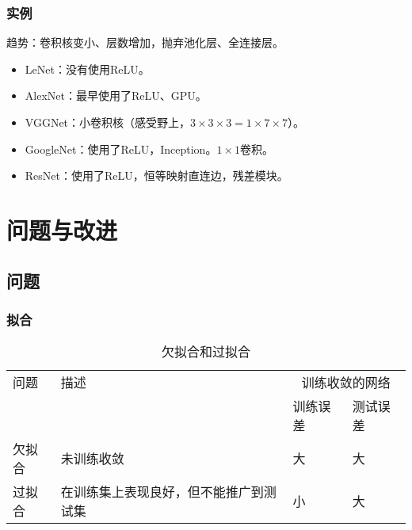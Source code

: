 \documentclass[
12pt, %
a4paper, 
oneside, %
headinclude,footinclude, %
]{scrartcl}
\begin{document}
\subsubsection[实例]{实例}
趋势：卷积核变小、层数增加，抛弃池化层、全连接层。
\begin{itemize}
\item LeNet：没有使用ReLU。
\item AlexNet：最早使用了ReLU、GPU。
\item VGGNet：小卷积核（感受野上，$ 3 \times 3 \times 3  = 1 \times 7 \times 7 $）。
\item GoogleNet：使用了ReLU，Inception。$ 1 \times 1 $卷积。
\item ResNet：使用了ReLU，恒等映射直连边，残差模块。
\end{itemize}
\section[问题与改进]{问题与改进}
\subsection[问题]{问题}
\subsubsection[拟合]{拟合}
\begin{table}[H]
\centering
\begin{tabular}{|p{1.5cm}|p{8.5cm}|p{2cm}|p{2cm}|}
\hline
问题 & 描述 & \multicolumn{2}{|c|}{训练收敛的网络} \\
\cline{3-4}
 &  & 训练误差 & 测试误差 \\
\hline
欠拟合 & 未训练收敛 & 大 & 大 \\
\hline
过拟合 & 在训练集上表现良好，但不能推广到测试集 & 小 & 大 \\
\hline
\end{tabular}
\caption{欠拟合和过拟合}
\end{table}
\end{document}
